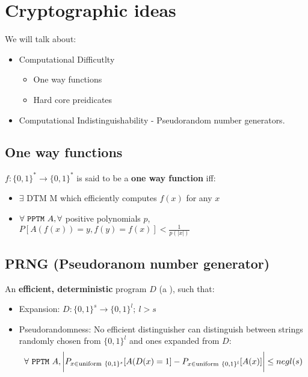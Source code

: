 \chapter{Cryptographic ideas}

We will talk about:
\begin{itemize}
\item Computational Difficutlty 
    \begin{itemize}
    \item One way functions
    \item Hard core preidicates
    \end{itemize}

\item Computational Indistinguishability - Pseudorandom number generators.
\end{itemize}

\section{One way functions}
$f: \{0, 1\}^* \to \{0, 1\}^*$ is said to be a \textbf{one way function} iff:
\begin{itemize}
\item $\exists$ DTM M which efficiently computes $f(x)$ for any $x$
\item $\forall~\texttt{PPTM}~A, \forall$ positive polynomials $p$, $P[A(f(x)) = y, f(y) = f(x)] < \frac{1}{p(|x|)}$
\end{itemize}

\section{PRNG (Pseudoranom number generator)}
An \textbf{efficient, deterministic} program $D$ (a \dtm), such that:
\begin{itemize}
\item Expansion: $D: \{0, 1\}^s \to \{0, 1\}^l;~l > s$
\item Pseudorandomness: No efficient distinguisher can distinguish between strings
randomly chosen from $\{0, 1\}^l$ and ones expanded from $D$:
$$\forall~\texttt{PPTM}~A, \bigg| P_{x \in \text{uniform}~\{0, 1\}^s}[A(D(x)=1] - P_{x\in \text{uniform}~\{0,1\}^l}[A(x)] \bigg| \leq negl(s)$$
\end{itemize}


